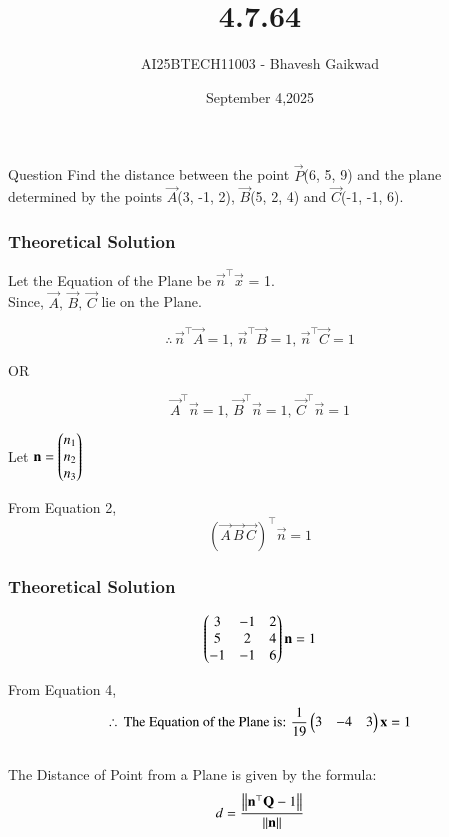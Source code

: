 \documentclass{beamer}
\title
{4.7.64}
\date{September 4,2025}
\author 
{AI25BTECH11003 - Bhavesh Gaikwad}
\begin{document}
\frame{\titlepage}
\begin{frame}{Question}
\centering
Find the distance between the point $\vec{P}$(6, 5, 9) and the plane determined by the points $\vec{A}$(3, -1, 2), $\vec{B}$(5, 2, 4) and $\vec{C}$(-1, -1, 6).
\end{frame}


\begin{frame}[fragile]
    \frametitle{Theoretical Solution}
Let the Equation of the Plane be $\vec{n}^\top\vec{x}$ = 1.\\

Since, $\vec{A}, \, \vec{B}, \, \vec{C}$ lie on the Plane.

\begin{equation}
    \therefore \, \vec{n}^\top\vec{A}=1, \, \vec{n}^\top\vec{B}=1,  \, \vec{n}^\top\vec{C}=1
\end{equation}

\begin{center}
    OR
\end{center}

\begin{equation}
    \vec{A}^\top\vec{n}=1, \, \vec{B}^\top\vec{n}=1, \, \vec{C}^\top\vec{n}=1
\end{equation}

Let $\mathbf{n} = \begin{pmatrix}n_1 \\ n_2 \\ n_3\end{pmatrix}$

From Equation 2,
\begin{equation}
    (\vec{A} \, \vec{B} \, \vec{C})^\top \vec{n}=1
\end{equation}
\end{frame}

\begin{frame}[fragile]
\frametitle{Theoretical Solution}
\begin{equation}
\begin{pmatrix}3 & -1 & 2 \\ 5 & 2 & 4\\ -1 & -1 & 6\end{pmatrix}\mathbf{n} = 1
\end{equation}


From Equation 4,
\begin{equation}
\therefore \, \text{The Equation of the Plane is: } \dfrac{1}{19}\begin{pmatrix}3 & -4 & 3\end{pmatrix}\mathbf{x} = 1
\end{equation}\\

The Distance of Point from a Plane is given by the formula:
\begin{equation}
    d = \dfrac{\left\lVert\mathbf{n}^\top\mathbf{Q}-1\right\rVert}{\left\lVert\mathbf{n}\right\rVert}
\end{equation}
\end{frame}
\end{document}

